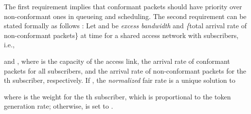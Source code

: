 \documentclass[conference,twoside,final]{IEEEtran}
\begin{document}
The first requirement implies that conformant packets should have priority over
non-conformant ones in queueing and scheduling. The second requirement can be
stated formally as follows \cite{Kim:14-1}: Let  and  be
\textit{excess bandwidth} and \textit\{total arrival rate of non-conformant
packets\} at time  for a shared access network with  subscribers, i.e.,

and ,
where  is the capacity of the access link,  the arrival rate of
conformant packets for all subscribers, and  the arrival rate of
non-conformant packets for the th subscriber, respectively. If
, the \textit{normalized} fair rate  is a unique
solution to

where  is the weight for the th subscriber, which is proportional to the
token generation rate; otherwise,  is set to
 \cite{stoica03:_core}.
\end{document}
